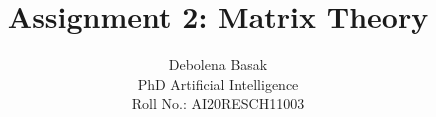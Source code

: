 \documentclass[journal,12pt,twocolumn]{IEEEtran}
\begin{document}
\makeatletter
{}
\makeatother
\let\StandardTheFigure\thefigure
\let\vec\mathbf
\renewcommand{\thefigure}{\theproblem}
\def\putbox#1#2#3{\makebox[0in][l]{\makebox[#1][l]{}\raisebox{\baselineskip}[0in][0in]{\raisebox{#2}[0in][0in]{#3}}}}
     \def\rightbox#1{\makebox[0in][r]{#1}}
     \def\centbox#1{\makebox[0in]{#1}}
     \def\topbox#1{\raisebox{-\baselineskip}[0in][0in]{#1}}
     \def\midbox#1{\raisebox{-0.5\baselineskip}[0in][0in]{#1}}
\vspace{3cm}
\title{Assignment 2: Matrix Theory}
\author{Debolena Basak\\PhD Artificial Intelligence\\ Roll No.: AI20RESCH11003}
%
%
%
% 
%
\end{document}

